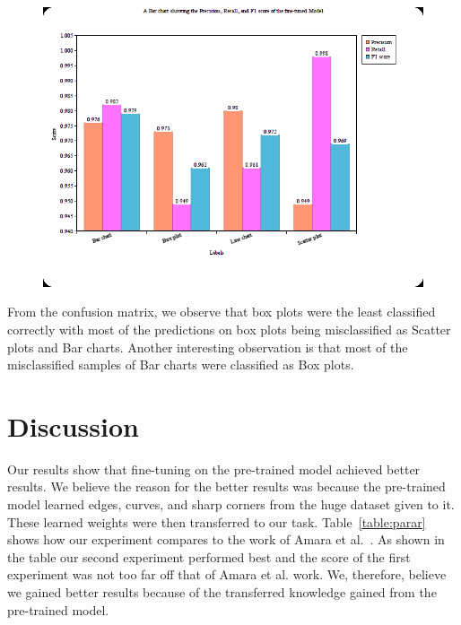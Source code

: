 \documentclass[12pt, a4paper,oneside]{report}
\begin{document}
\begin{figure}[!htbp]
	\includegraphics [scale=0.8] {mat2.png}
	\label{fig:missy2}
\end{figure}

From the confusion matrix, we observe that box plots were the least classified correctly with most of the predictions on box plots being misclassified as Scatter plots and Bar charts. Another interesting observation is that most of the misclassified samples of Bar charts were classified as Box plots. 

\section{Discussion}
Our results show that fine-tuning on the pre-trained model achieved better results. We believe the reason for the better results was because the pre-trained model learned edges, curves, and sharp corners from the huge dataset given to it. These learned weights were then transferred to our task. Table~\ref{table:parar} shows how our experiment compares to the work of Amara et al.~\cite{amara2017convolutional}. As shown in the table our second experiment performed best and the score of the first experiment was not too far off that of Amara et al. work. We, therefore, believe we gained better results because of the transferred knowledge gained from the pre-trained model.
\end{document}
